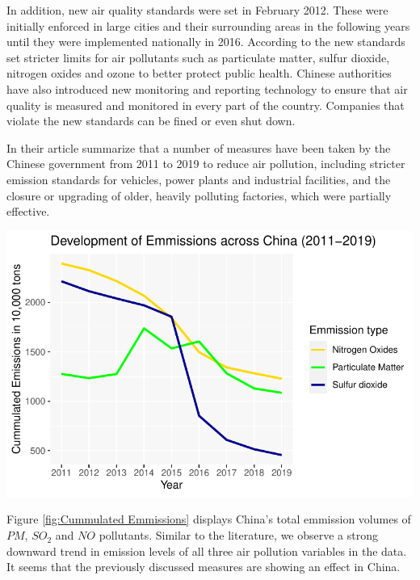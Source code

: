 \documentclass[
]{article}
\begin{document}
	In addition, new air quality standards were set in February 2012. These were initially enforced in large cities and their surrounding areas in the following years until they were implemented nationally in 2016. According to the \cite{Transport2012} new standards set stricter limits for air pollutants such as particulate matter, sulfur dioxide, nitrogen oxides and ozone to better protect public health. Chinese authorities have also introduced new monitoring and reporting technology to ensure that air quality is measured and monitored in every part of the country. Companies that violate the new standards can be fined or even shut down. 
	
	In their article \cite{ijerph13121219} summarize that a number of measures have been taken by the Chinese government from 2011 to 2019 to reduce air pollution, including stricter emission standards for vehicles, power plants and industrial facilities, and the closure or upgrading of older, heavily polluting factories, which were partially effective. 
	
	\begin{center}
	\includegraphics[width = 440pt]{Development of Emmissions China total.pdf} 
	\label{fig:Cummulated Emmissions}
	\end{center}

	Figure \ref{fig:Cummulated Emmissions} displays China's total emmission volumes of $PM$, $SO_2$ and $NO$ pollutants. Similar to the literature, we observe a strong downward trend in emission levels of all three air pollution variables in the data. It seems that the previously discussed measures are showing an effect in China. 
\end{document}
